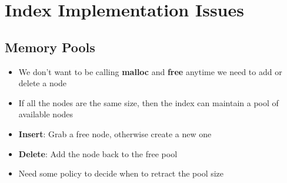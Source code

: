 \documentclass[11pt]{article}
\begin{document}
\maketitle
\thispagestyle{plain}

\section{Index Implementation Issues}
    \subsection*{Memory Pools}
        \begin{itemize}
            \item We don't want to be calling \textbf{malloc} and \textbf{free} anytime we need to add or delete a node
            \item If all the nodes are the same size, then the index can maintain a pool of available nodes
            \item \textbf{Insert}: Grab a free node, otherwise create a new one
            \item \textbf{Delete}: Add the node back to the free pool
            \item Need some policy to decide when to retract the pool size
        \end{itemize}
\end{document}
